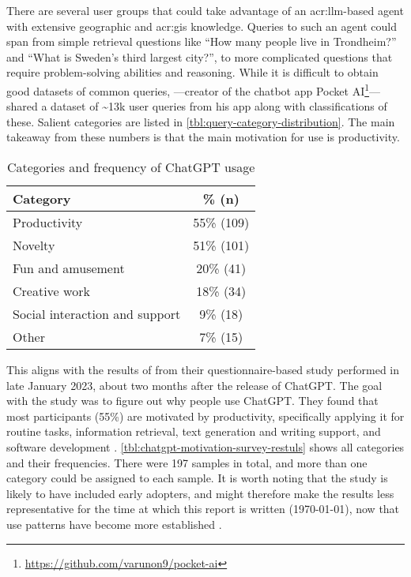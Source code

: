 There are several user groups that could take advantage of an \acrshort{acr:llm}-based agent with extensive geographic and \acrshort{acr:gis} knowledge. Queries to such an agent could span from simple retrieval questions like \enquote{How many people live in Trondheim?} and \enquote{What is Sweden's third largest city?}, to more complicated questions that require problem-solving abilities and reasoning. While it is difficult to obtain good datasets of common queries, \cite{kumarWhatArePeople2023a}---creator of the chatbot app Pocket AI\footnote{\url{https://github.com/varunon9/pocket-ai}}---shared a dataset of \textasciitilde 13k user queries from his app along with classifications of these. Salient categories are listed in \autoref{tbl:query-category-distribution}. The main takeaway from these numbers is that the main motivation for use is productivity.

\begin{table}[ht]
    \centering
    \begin{tabular}[t]{l|c}
        \toprule
        \textbf{Category}              & \% \textbf{(n)} \\
        \midrule
        Productivity                   & 55\% (109)      \\
        Novelty                        & 51\% (101)      \\
        Fun and amusement              & 20\% (41)       \\
        Creative work                  & 18\% (34)       \\
        Social interaction and support & 9\% (18)        \\
        Other                          & 7\% (15)        \\
        \bottomrule
    \end{tabular}
    \caption{Categories and frequency of ChatGPT usage \citep[16-17]{skjuveWhyPeopleUse2023}}
    \label{tbl:chatgpt-motivation-survey-restuls}
\end{table}

This aligns with the results of \cite{skjuveWhyPeopleUse2023} from their questionnaire-based study performed in late January 2023, about two months after the release of ChatGPT. The goal with the study was to figure out why people use ChatGPT. They found that most participants (55\%) are motivated by productivity, specifically applying it for routine tasks, information retrieval, text generation and writing support, and software development \citep[17-21]{skjuveWhyPeopleUse2023}. \autoref{tbl:chatgpt-motivation-survey-restuls} shows all categories and their frequencies. There were 197 samples in total, and more than one category could be  assigned to each sample. It is worth noting that the study is likely to have included early adopters, and might therefore make the results less representative for the time at which this report is written (\today), now that use patterns have become more established \citep[37]{skjuveWhyPeopleUse2023}.

